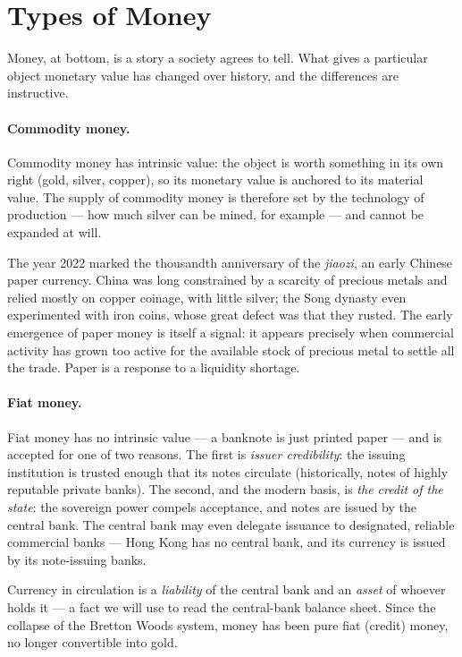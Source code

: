 \section{Types of Money}

Money, at bottom, is a story a society agrees to tell. What gives a particular object monetary value has changed over history, and the differences are instructive.

\paragraph{Commodity money.} Commodity money has intrinsic value: the object is worth something in its own right (gold, silver, copper), so its monetary value is anchored to its material value. The supply of commodity money is therefore set by the technology of production --- how much silver can be mined, for example --- and cannot be expanded at will.

\begin{remark}
The year 2022 marked the thousandth anniversary of the \emph{jiaozi}, an early Chinese paper currency. China was long constrained by a scarcity of precious metals and relied mostly on copper coinage, with little silver; the Song dynasty even experimented with iron coins, whose great defect was that they rusted. The early emergence of paper money is itself a signal: it appears precisely when commercial activity has grown too active for the available stock of precious metal to settle all the trade. Paper is a response to a liquidity shortage.
\end{remark}

\paragraph{Fiat money.} Fiat money has no intrinsic value --- a banknote is just printed paper --- and is accepted for one of two reasons. The first is \emph{issuer credibility}: the issuing institution is trusted enough that its notes circulate (historically, notes of highly reputable private banks). The second, and the modern basis, is \emph{the credit of the state}: the sovereign power compels acceptance, and notes are issued by the central bank. The central bank may even delegate issuance to designated, reliable commercial banks --- Hong Kong has no central bank, and its currency is issued by its note-issuing banks.

Currency in circulation is a \emph{liability} of the central bank and an \emph{asset} of whoever holds it --- a fact we will use to read the central-bank balance sheet. Since the collapse of the Bretton Woods system, money has been pure fiat (credit) money, no longer convertible into gold.

